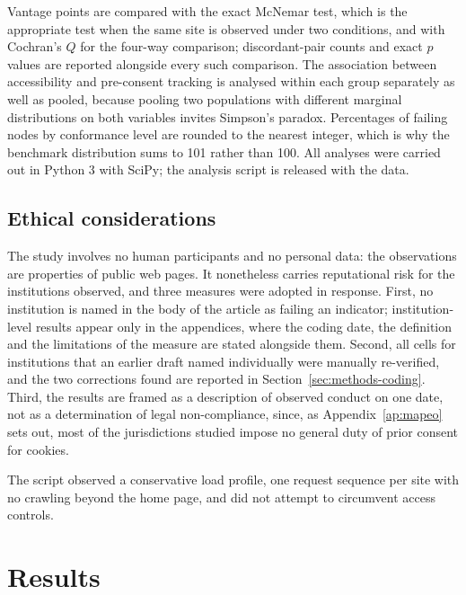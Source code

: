 \documentclass[pdflatex,sn-basic,Numbered]{sn-jnl}
\theoremstyle{thmstyleone}
\theoremstyle{thmstyletwo}
\theoremstyle{thmstylethree}
\begin{document}
Vantage points are compared with the exact McNemar test, which is the appropriate test when the same site is observed under two conditions, and with Cochran's $Q$ for the four-way comparison; discordant-pair counts and exact $p$ values are reported alongside every such comparison. The association between accessibility and pre-consent tracking is analysed within each group separately as well as pooled, because pooling two populations with different marginal distributions on both variables invites Simpson's paradox. Percentages of failing nodes by conformance level are rounded to the nearest integer, which is why the benchmark distribution sums to 101 rather than 100. All analyses were carried out in Python 3 with SciPy; the analysis script is released with the data.

\subsection{Ethical considerations}\label{sec:methods-ethics}

The study involves no human participants and no personal data: the observations are properties of public web pages. It nonetheless carries reputational risk for the institutions observed, and three measures were adopted in response. First, no institution is named in the body of the article as failing an indicator; institution-level results appear only in the appendices, where the coding date, the definition and the limitations of the measure are stated alongside them. Second, all cells for institutions that an earlier draft named individually were manually re-verified, and the two corrections found are reported in Section~\ref{sec:methods-coding}. Third, the results are framed as a description of observed conduct on one date, not as a determination of legal non-compliance, since, as Appendix~\ref{ap:mapeo} sets out, most of the jurisdictions studied impose no general duty of prior consent for cookies.

The script observed a conservative load profile, one request sequence per site with no crawling beyond the home page, and did not attempt to circumvent access controls.

\section{Results}\label{sec:results}
\end{document}
